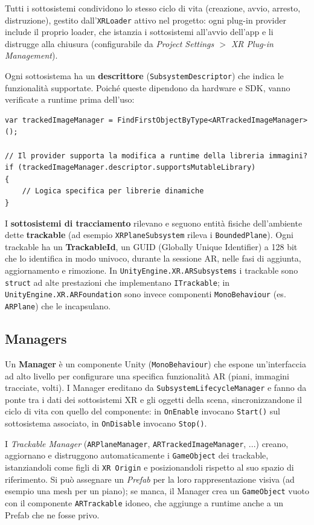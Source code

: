Tutti i sottosistemi condividono lo stesso ciclo di vita (creazione, avvio, arresto, distruzione), gestito dall'\texttt{XRLoader} attivo nel progetto: ogni plug-in provider include il proprio loader, che istanzia i sottosistemi all'avvio dell'app e li distrugge alla chiusura (configurabile da \textit{Project Settings $>$ XR Plug-in Management}).

Ogni sottosistema ha un \textbf{descrittore} (\texttt{SubsystemDescriptor}) che indica le funzionalità supportate. Poiché queste dipendono da hardware e SDK, vanno verificate a runtime prima dell'uso:

\begin{lstlisting}[language={[Sharp]C}]
var trackedImageManager = FindFirstObjectByType<ARTrackedImageManager>();

// Il provider supporta la modifica a runtime della libreria immagini?
if (trackedImageManager.descriptor.supportsMutableLibrary)
{
    // Logica specifica per librerie dinamiche
}
\end{lstlisting}

I \textbf{sottosistemi di tracciamento} rilevano e seguono entità fisiche dell'ambiente dette \textbf{trackable} (ad esempio \texttt{XRPlaneSubsystem} rileva i \texttt{BoundedPlane}). Ogni trackable ha un \textbf{TrackableId}, un GUID (Globally Unique Identifier) a 128 bit che lo identifica in modo univoco, durante la sessione AR, nelle fasi di aggiunta, aggiornamento e rimozione. In \texttt{UnityEngine.XR.ARSubsystems} i trackable sono \texttt{struct} ad alte prestazioni che implementano \texttt{ITrackable}; in \texttt{UnityEngine.XR.ARFoundation} sono invece componenti \texttt{MonoBehaviour} (es. \texttt{ARPlane}) che le incapsulano.

\subsection{Managers}
Un \textbf{Manager} è un componente Unity (\texttt{MonoBehaviour}) che espone un'interfaccia ad alto livello per configurare una specifica funzionalità AR (piani, immagini tracciate, volti). I Manager ereditano da \texttt{SubsystemLifecycleManager} e fanno da ponte tra i dati dei sottosistemi XR e gli oggetti della scena, sincronizzandone il ciclo di vita con quello del componente: in \texttt{OnEnable} invocano \texttt{Start()} sul sottosistema associato, in \texttt{OnDisable} invocano \texttt{Stop()}.

I \textit{Trackable Manager} (\texttt{ARPlaneManager}, \texttt{ARTrackedImageManager}, ...) creano, aggiornano e distruggono automaticamente i \texttt{GameObject} dei trackable, istanziandoli come figli di \texttt{XR Origin} e posizionandoli rispetto al suo spazio di riferimento. Si può assegnare un \textit{Prefab} per la loro rappresentazione visiva (ad esempio una mesh per un piano); se manca, il Manager crea un \texttt{GameObject} vuoto con il componente \texttt{ARTrackable} idoneo, che aggiunge a runtime anche a un Prefab che ne fosse privo.

